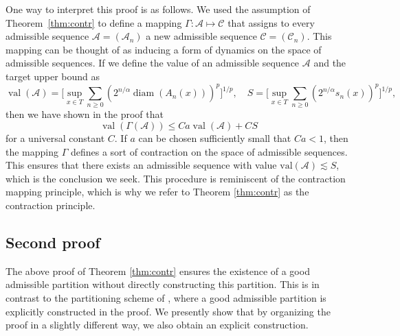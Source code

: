 \documentclass[10pt,reqno]{amsart}
\theoremstyle{definition}
\numberwithin{equation}{section}
\numberwithin{figure}{section}
\numberwithin{table}{section}
\newcommand{\diam}{\mathop{\mathrm{diam}}}
\begin{document}
One way to interpret this proof is as follows. We used the assumption of 
Theorem~\ref{thm:contr} to define a mapping 
$\Gamma:\mathcal{A}\mapsto\mathcal{C}$ that assigns to every admissible 
sequence $\mathcal{A}=(\mathcal{A}_n)$ a new admissible sequence 
$\mathcal{C}=(\mathcal{C}_n)$. This mapping can be thought of as inducing 
a form of dynamics on the space of admissible sequences. If we define the 
value of an admissible sequence $\mathcal{A}$ and the target upper bound 
as
$$
	\mathop{\mathrm{val}}(\mathcal{A}) = 
	\Bigg[
        \sup_{x\in T}
        \sum_{n\ge 0}(2^{n/\alpha}\diam(A_n(x)))^p\Bigg]^{1/p},\quad
	S = 
	\Bigg[
        \sup_{x\in T}
        \sum_{n\ge 0}(2^{n/\alpha}s_n(x))^p\Bigg]^{1/p},
$$
then we have shown in the proof that
$$
	\mathop{\mathrm{val}}(\Gamma(\mathcal{A})) \le
	Ca\mathop{\mathrm{val}}(\mathcal{A}) +
        CS
$$
for a universal constant $C$. If $a$ can be chosen sufficiently 
small that $Ca<1$, then the mapping $\Gamma$ defines a sort of contraction 
on the space of admissible sequences. This ensures that there exists an 
admissible sequence with value $\mathrm{val}(\mathcal{A})\lesssim S$, 
which is the conclusion we seek. This procedure is reminiscent of the 
contraction mapping principle, which is why we refer to Theorem 
\ref{thm:contr} as the contraction principle.

\subsection{Second proof}

The above proof of Theorem \ref{thm:contr} ensures the existence of a good 
admissible partition without directly constructing this partition. This is 
in contrast to the partitioning scheme of \cite{Tal14}, where a good 
admissible partition is explicitly constructed in the proof. We presently 
show that by organizing the proof in a slightly different way, we also
obtain an explicit construction.
\end{document}
